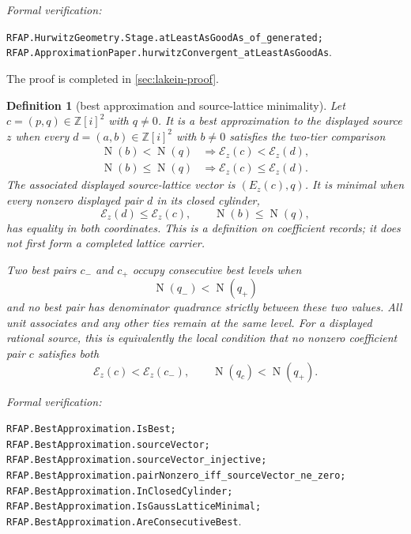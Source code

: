 \documentclass[11pt]{article}
\newtheorem{definition}[definition]{Definition}
\newcommand{\Zi}{\mathbb{Z}[i]}
\newcommand{\Norm}[1]{\operatorname{N}\!\left(#1\right)}
\newcommand{\leanref}[1]{\par\smallskip\noindent
  \emph{Formal verification:}\par\nobreak
  {\raggedright\nolinkurl{#1}.\par}}
\begin{document}
\leanref{RFAP.HurwitzGeometry.Stage.atLeastAsGoodAs_of_generated;
RFAP.ApproximationPaper.hurwitzConvergent_atLeastAsGoodAs}

The proof is completed in \cref{sec:lakein-proof}.

\begin{definition}[best approximation and source-lattice minimality]
\label{def:best-approximation}
Let $c=(p,q)\in\Zi^2$ with $q\ne0$.  It is a \emph{best approximation} to
the displayed source $z$ when every $d=(a,b)\in\Zi^2$ with $b\ne0$
satisfies the two-tier comparison
\begin{align}
 \Norm b<\Norm q
   &\Longrightarrow \mathcal E_z(c)<\mathcal E_z(d),
   \label{eq:best-strict}\\
 \Norm b\le\Norm q
   &\Longrightarrow \mathcal E_z(c)\le\mathcal E_z(d).
   \label{eq:best-weak}
\end{align}
The associated displayed source-lattice vector is $(E_z(c),q)$.  It is
\emph{minimal} when every nonzero displayed pair $d$ in its closed cylinder,
\[
       \mathcal E_z(d)\le\mathcal E_z(c),\qquad
       \Norm b\le\Norm q,
\]
has equality in both coordinates.  This is a definition on coefficient
records; it does not first form a completed lattice carrier.

Two best pairs $c_-$ and $c_+$ occupy \emph{consecutive best levels} when
\[
  \Norm{q_-}<\Norm{q_+}
\]
and no best pair has denominator quadrance strictly between these two values.
All unit associates and any other ties remain at the same level.  For a
displayed rational source, this is equivalently the local condition that no
nonzero coefficient pair $c$ satisfies both
\[
 \mathcal E_z(c)<\mathcal E_z(c_-),
 \qquad \Norm{q_c}<\Norm{q_+}.
\]
\end{definition}

\leanref{RFAP.BestApproximation.IsBest;
RFAP.BestApproximation.sourceVector;
RFAP.BestApproximation.sourceVector_injective;
RFAP.BestApproximation.pairNonzero_iff_sourceVector_ne_zero;
RFAP.BestApproximation.InClosedCylinder;
RFAP.BestApproximation.IsGaussLatticeMinimal;
RFAP.BestApproximation.AreConsecutiveBest}
\end{document}

